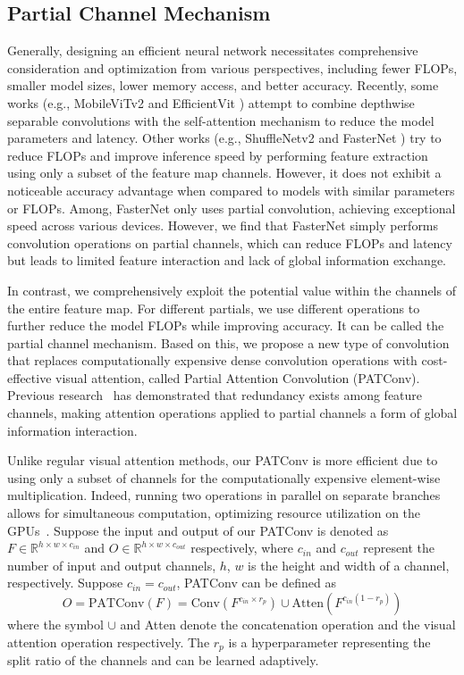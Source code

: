\subsection{Partial Channel Mechanism}
Generally, designing an efficient neural network necessitates comprehensive consideration and optimization from various perspectives, including fewer FLOPs, smaller model sizes, lower memory access, and better accuracy. Recently, some works (e.g., MobileViTv2 \cite{Mehta2022} and EfficientVit \cite{Cai2023b}) attempt to combine depthwise separable convolutions with the self-attention mechanism to reduce the model parameters and latency. Other works (e.g., ShuffleNetv2 \cite{Ma2018} and FasterNet \cite{Chen2023}) try to reduce FLOPs and improve inference speed by performing feature extraction using only a subset of the feature map channels. However, it does not exhibit a noticeable accuracy advantage when compared to models with similar parameters or FLOPs. Among, FasterNet only uses partial convolution, achieving exceptional speed across various devices. However, we find that FasterNet simply performs convolution operations on partial channels, which can reduce FLOPs and latency but leads to limited feature interaction and lack of global information exchange. 

In contrast, we comprehensively exploit the potential value within the channels of the entire feature map. For different partials, we use different operations to further reduce the model FLOPs while improving accuracy. It can be called the partial channel mechanism. Based on this, we propose a new type of convolution that replaces computationally expensive dense convolution operations with cost-effective visual attention, called Partial Attention Convolution (PATConv). Previous research~\cite{Han2020, Chen2023} has demonstrated that redundancy exists among feature channels, making attention operations applied to partial channels a form of global information interaction.

Unlike regular visual attention methods, our PATConv is more efficient due to using only a subset of channels for the computationally expensive element-wise multiplication. Indeed, running two operations in parallel on separate branches allows for simultaneous computation, optimizing resource utilization on the GPUs~\cite{kirk2016programming}. Suppose the input and output of our PATConv is denoted as {\small $F\in\mathbb{R}^{h\times w\times c_{in}}$} and {\small $O \in\mathbb{R}^{h\times w\times c_{out}}$} respectively, where {\small $c_{in}$} and {\small $c_{out}$} represent the number of input and output channels, {\small $h$}, {\small $w$} is the height and width of a channel, respectively. Suppose {\small $c_{in}=c_{out}$}, PATConv can be defined as
{\small
\begin{equation}
  O =\text{PATConv}(F) =\text{Conv}(F^{c_{in}\times r_p}) \cup \text{Atten}(F^{c_{in}(1-r_p)})
\end{equation}
}
where the symbol {\small $\cup$} and {\small Atten} denote the concatenation operation and the visual attention operation respectively. The {\small $r_p$} is a hyperparameter representing the split ratio of the channels and can be learned adaptively.

